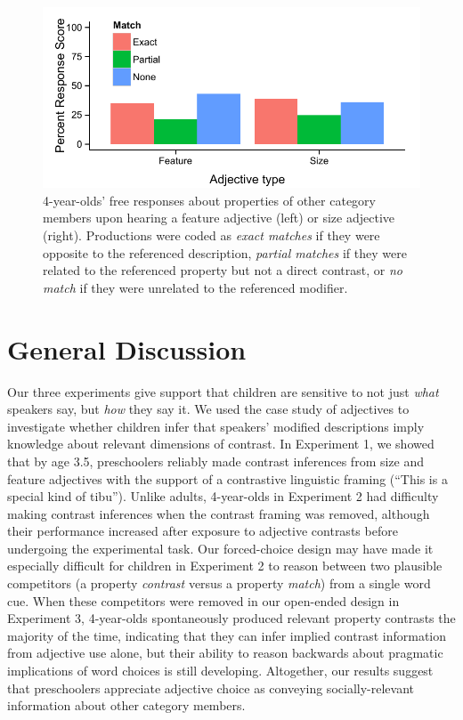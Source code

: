 \documentclass[man]{apa2}
\begin{document}
\begin{figure}[t] 
  \begin{center} 
    \includegraphics[width=6in]{figures/freeResponse_bars.pdf} 
    \caption{\label{fig:freeResponse} 4-year-olds' free responses about properties of other category members upon hearing a feature adjective (left) or size adjective (right).  Productions were coded as \emph{exact matches} if they were opposite to the referenced description, \emph{partial matches} if they were related to the referenced property but not a direct contrast, or \emph{no match} if they were unrelated to the referenced modifier. }
  \end{center} 
\end{figure}


\section{General Discussion}

Our three experiments give support that children are sensitive to not just \emph{what} speakers say, but \emph{how} they say it.  We used the case study of adjectives to investigate whether children infer that speakers' modified descriptions imply knowledge about relevant dimensions of contrast. In Experiment 1, we showed that by age 3.5, preschoolers reliably made contrast inferences from size and feature adjectives with the support of a contrastive linguistic framing (``This is a special kind of tibu'').  Unlike adults, 4-year-olds in Experiment 2 had difficulty making contrast inferences when the contrast framing was removed, although their performance increased after exposure to adjective contrasts before undergoing the experimental task. Our forced-choice design may have made it especially difficult for children in Experiment 2 to reason between two plausible competitors (a property \emph{contrast} versus a property \emph{match}) from a single word cue. When these competitors were removed in our open-ended design in Experiment 3, 4-year-olds spontaneously produced relevant property contrasts the majority of the time, indicating that they can infer implied contrast information from adjective use alone, but their ability to reason backwards about pragmatic implications of word choices is still developing. Altogether, our results suggest that preschoolers appreciate adjective choice as conveying socially-relevant information about other category members. 
\end{document}
